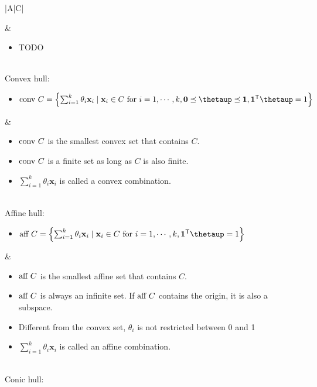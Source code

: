 \documentclass{article}
\newcommand{\trans}{\mathsf{T}}
\begin{document}
\begin{xltabular}{\textwidth}{|A|C|}
\begin{itemize}[leftmargin=*]
    \end{itemize} & \vspace{-3.5ex}
    \begin{itemize}[leftmargin=*]
        \item TODO
    \end{itemize}\\
    \hline
    Convex hull:
    \begin{itemize}[leftmargin=*]
        \item $\textnormal{conv } C = \left\{ \sum_{i=1}^{k} \theta_i\mathbf{x}_i \mid \mathbf{x}_i \in C \textnormal{ for } i=1,\cdots, k, \mathbf{0} \preceq \boldsymbol{\thetaup} \preceq \mathbf{1}, \mathbf{1}^\trans\boldsymbol{\thetaup} = 1  \right\}$
    \end{itemize} & \vspace{-3.5ex}
    \begin{itemize}[leftmargin=*]
        \item $\textnormal{conv } C$ is the smallest convex set that contains $C$.
        \item $\textnormal{conv } C$ is a finite set as long as $C$ is also finite.
        \item \(\sum_{i=1}^{k} \theta_i\mathbf{x}_i\) is called a convex combination.
    \end{itemize}\\
	\hline
	Affine hull:
	\begin{itemize}[leftmargin=*]
		\item $\textnormal{aff } C = \left\{ \sum_{i=1}^{k} \theta_i\mathbf{x}_i \mid \mathbf{x}_i \in C \textnormal{ for } i=1,\cdots, k, \mathbf{1}^\trans\boldsymbol{\thetaup} = 1  \right\}$
	\end{itemize} & \vspace{-3.5ex}
	\begin{itemize}[leftmargin=*]
		\item $\textnormal{aff } C$ is the smallest affine set that contains $C$.
		\item $\textnormal{aff } C$ is always an infinite set. If $\textnormal{aff } C$ contains the origin, it is also a subspace.
		\item Different from the convex set, \(\theta_i\) is not restricted between 0 and 1
		\item \(\sum_{i=1}^{k} \theta_i\mathbf{x}_i\) is called an affine combination.
	\end{itemize}\\
	\hline
	Conic hull:
	\begin{itemize}[leftmargin=*]

\end{itemize}
\end{xltabular}
\end{document}
